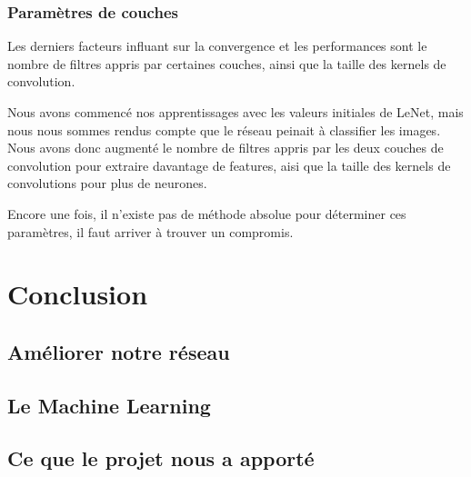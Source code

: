 \documentclass[a4paper,12pt]{article}
\begin{document}
    \subsubsection{Paramètres de couches}
      Les derniers facteurs influant sur la convergence et les performances sont le nombre de filtres appris par certaines couches, ainsi que la taille des kernels de convolution. 

      Nous avons commencé nos apprentissages avec les valeurs initiales de LeNet, mais nous nous sommes rendus compte que le réseau peinait à classifier les images. Nous avons donc augmenté le nombre de filtres appris par les deux couches de convolution pour extraire davantage de features, aisi que la taille des kernels de convolutions pour plus de neurones. 

      Encore une fois, il n'existe pas de méthode absolue pour déterminer ces paramètres, il faut arriver à trouver un compromis.

\newpage
\section*{Conclusion}
  
  \subsection*{Améliorer notre réseau}
  
  \subsection*{Le Machine Learning}
  
  \subsection*{Ce que le projet nous a apporté}
\end{document}
